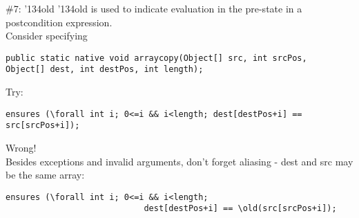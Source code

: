 \documentclass[
pdf,
nocolorBG,
slideColor,
cok,
]{prosper}
\newcommand{\bsl}{\char'134}
\newcommand{\old}{\bsl old}
\begin{document}

\begin{slide}{\#7: \old}
\vspace*{-6ex}
{\knalblue \old} is used to indicate evaluation in the pre-state in a postcondition expression.\\
\vspace{1ex}
Consider specifying
{\tiny
\begin{verbatim} 
public static native void arraycopy(Object[] src, int srcPos,                                    Object[] dest, int destPos, int length);
\end{verbatim}
}
Try:
{\tiny
\begin{verbatim} 
ensures (\forall int i; 0<=i && i<length; dest[destPos+i] == src[srcPos+i]);
\end{verbatim}
}

{\red
Wrong!}\\
\vspace{1ex}
Besides exceptions and invalid arguments, don't forget aliasing - {\blue dest} and {\blue src} may be the same array:
{\tiny
\begin{verbatim} 
ensures (\forall int i; 0<=i && i<length; 
                            dest[destPos+i] == \old(src[srcPos+i]);
\end{verbatim}
}

\end{slide}

\end{document}
